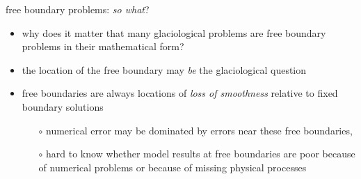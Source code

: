 \begin{frame}{free boundary problems: \emph{so what}?}
\begin{itemize}
\item why does it matter that many glaciological problems are free boundary problems in their mathematical form?
\item the location of the free boundary may \emph{be} the glaciological question
\item free boundaries are always locations of \emph{loss of smoothness} relative to fixed boundary solutions
     \begin{itemize}
     \item[$\circ$] numerical error may be dominated by errors near these free boundaries, 
     \item[$\circ$] hard to know whether model results at free boundaries are poor because of numerical problems or because of missing physical processes
     \end{itemize}
\end{itemize}
\end{frame}
